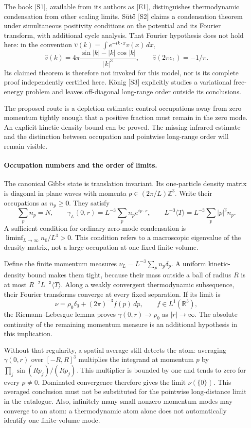 \documentclass[11pt]{article}
\begin{document}
The book [S1], available from its authors as [E1], distinguishes
thermodynamic condensation from other scaling limits. S\"ut\H{o} [S2]
claims a condensation theorem under simultaneous positivity conditions
on the potential and its Fourier transform, with additional cycle
analysis. That Fourier hypothesis does not hold here: in the convention
$\widehat v(k)=\int e^{-ik\cdot x}v(x)\,dx$,
\[
 \widehat v(k)=4\pi\frac{\sin |k|-|k|\cos|k|}{|k|^3},
 \qquad \widehat v(2\pi e_1)=-1/\pi.
\]
Its claimed theorem is therefore not invoked for this model, nor is
its complete proof independently certified here. K\"onig [S3]
explicitly studies a variational free-energy problem and leaves
off-diagonal long-range order outside its conclusions.

The proposed route is a depletion estimate: control occupations away
from zero momentum tightly enough that a positive fraction must remain
in the zero mode. An explicit kinetic-density bound can be proved.
The missing infrared estimate and the distinction between occupation
and pointwise long-range order will remain visible.

\paragraph{Occupation numbers and the order of limits.}
The canonical Gibbs state is translation invariant. Its one-particle
density matrix is diagonal in plane waves with momenta
$p\in(2\pi/L)\mathbb Z^3$. Write their occupations as $n_p\ge0$.
They satisfy
\[
 \sum_p n_p=N,\qquad
 \gamma_L(0,r)=L^{-3}\sum_p n_p e^{ip\cdot r},\qquad
 L^{-3}\langle T\rangle=L^{-3}\sum_p |p|^2n_p.
\]
A sufficient condition for ordinary zero-mode condensation is
$\liminf_{L\to\infty}n_0/L^3>0$. This condition refers to a
macroscopic eigenvalue of the density matrix, not a large occupation
at one fixed finite volume.

Define the finite momentum measures
$\nu_L=L^{-3}\sum_p n_p\delta_p$. A uniform kinetic-density bound
makes them tight, because their mass outside a ball of radius $R$
is at most $R^{-2}L^{-3}\langle T\rangle$.
Along a weakly convergent thermodynamic subsequence, their Fourier
transforms converge at every fixed separation. If its limit is
\[
 \nu=\rho_0\delta_0+(2\pi)^{-3}f(p)\,dp,
 \qquad f\in L^1(\mathbb R^3),
\]
the Riemann--Lebesgue lemma proves
$\gamma(0,r)\to\rho_0$ as $|r|\to\infty$.
The absolute continuity of the remaining momentum measure is an
additional hypothesis in this implication.

Without that regularity, a spatial average still detects the atom:
averaging $\gamma(0,r)$ over $[-R,R]^3$ multiplies the integrand at
momentum $p$ by $\prod_j\sin(Rp_j)/(Rp_j)$. This multiplier is
bounded by one and tends to zero for every $p\ne0$.
Dominated convergence therefore gives the limit $\nu(\{0\})$.
This averaged conclusion must not be substituted for the pointwise
long-distance limit in the catalogue. Also, infinitely many small
nonzero momentum modes may converge to an atom: a thermodynamic atom
alone does not automatically identify one finite-volume mode.
\end{document}
